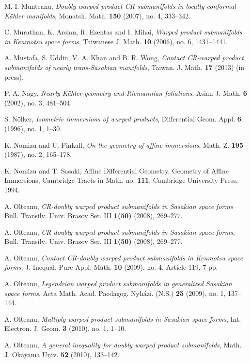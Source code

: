 \documentclass{amsart}
\theoremstyle{plain}
\numberwithin{equation}{section}
\theoremstyle{remark}
\numberwithin{equation}{section}
\begin{document}
\begin{thebibliography}{120}
 M.-I. Munteanu, {\it  Doubly warped product CR-submanifolds in locally conformal K\"ahler manifolds}, Monatsh. Math. {\bf 150} (2007), no. 4, 333--342.

 C.  Murathan, K. Arslan, R.  Ezentas and I. Mihai, {\it Warped product submanifolds in Kenmotsu space forms}, Taiwanese J. Math. {\bf 10} (2006), no. 6, 1431--1441. 

 A. Mustafa, S. Uddin, V. A. Khan and B. R. Wong, {\it Contact CR-warped product submanifolds of nearly trans-Sasakian manifolds}, Taiwan. J. Math. {\bf 17} (2013) (in press).

 P.-A. Nagy, {\it Nearly K\"ahler geometry and Riemannian foliations}, Asian J. Math. {\bf 6} (2002), no. 3, 481--504.

 S. N\"olker,  {\it Isometric immersions of warped products},  Differential Geom. Appl. {\bf 6} (1996), no. 1, 1--30.

 K. Nomizu and U. Pinkall, {\it On the geometry of affine immersions}, {Math. Z.} {\bf 195} (1987), no. 2, 165--178.

 K. Nomizu and T. Sasaki, {Affine Differential Geometry. Geometry of Affine Immersions}, {Cambridge Tracts in Math.} no. {\bf 111}, Cambridge University Press, 1994.

 A. Olteanu, {\it  CR-doubly warped product submanifolds in Sasakian space forms} Bull. Transilv. Univ. Brasov Ser. III {\bf 1(50)} (2008), 269--277. 

 A. Olteanu, {\it CR-doubly warped product submanifolds in Sasakian space forms}, Bull. Transilv. Univ. Brasov Ser. III {\bf 1(50)} (2008), 269--277.

 A. Olteanu, {\it  Contact CR-doubly warped product submanifolds in Kenmotsu space forms},  J. Inequal. Pure Appl. Math. {\bf 10} (2009), no. 4, Article 119, 7 pp.

 A. Olteanu, {\it  Legendrian warped product submanifolds in generalized Sasakian space forms},  Acta Math. Acad. Paedagog. Nyh\'azi. (N.S.) {\bf 25} (2009), no. 1, 137--144.

 A. Olteanu, {\it Multiply warped product submanifolds in Sasakian space forms}, Int. Electron. J. Geom. {\bf 3} (2010), no. 1, 1--10.

 A. Olteanu, {\it A general inequality for doubly warped product submanifolds}, Math. J. Okayama Univ. {\bf 52} (2010), 133--142.


\end{thebibliography}
\end{document}
